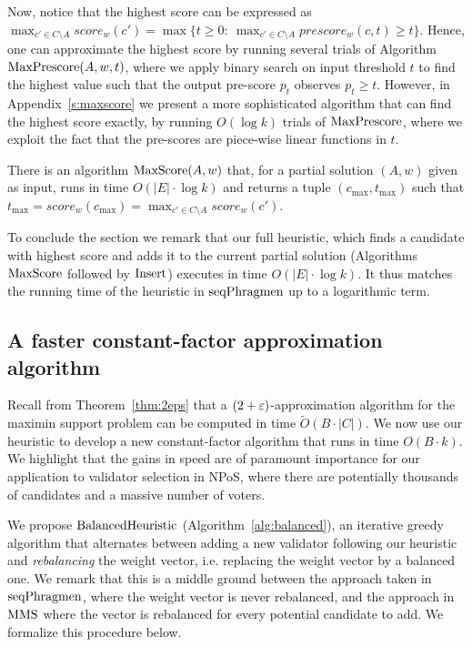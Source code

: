 Now, notice that the highest score can be expressed as $\max_{c'\in C\setminus A} score_w(c')=\max\{t\geq 0: \ \max_{c'\in C\setminus A} prescore_w(c,t)\geq t\}$. 
Hence, one can approximate the highest score by running several trials of Algorithm $\operatorname{MaxPrescore}(A,w,t)$, where we apply binary search on input threshold $t$ to find the highest value such that the output pre-score $p_t$ observes $p_t\geq t$. 
However, in Appendix~\ref{s:maxscore} we present a more sophisticated algorithm that can find the highest score exactly, by running $O(\log k)$ trials of $\operatorname{MaxPrescore}$, where we exploit the fact that the pre-scores are piece-wise linear functions in $t$.  

\begin{lemma}\label{lem:maxscore2}
There is an algorithm $\operatorname{MaxScore}(A,w)$ that, for a partial solution $(A,w)$ given as input, runs in time $O(|E|\cdot \log k)$ and returns a tuple $(c_{\max}, t_{\max})$ such that $t_{\max}=score_w(c_{\max})=\max_{c'\in C\setminus A} score_w(c')$.
\end{lemma}

To conclude the section we remark that our full heuristic, which finds a candidate with highest score and adds it to the current partial solution (Algorithms $\operatorname{MaxScore}$ followed by $\operatorname{Insert}$) executes in time $O(|E|\cdot \log k)$. It thus matches the running time of the heuristic in $\operatorname{seqPhragmen}$ up to a logarithmic term.

\subsection{A faster constant-factor approximation algorithm}\label{s:315}

Recall from Theorem~\ref{thm:2eps} that a $(2+\varepsilon)$-approximation algorithm for the maximin support problem can be computed in time $\tilde{O}(B\cdot |C|)$. We now use our heuristic to develop a new constant-factor algorithm that runs in time $O(B\cdot k)$. We highlight that the gains in speed are of paramount importance for our application to validator selection in NPoS, where there are potentially thousands of candidates and a massive number of voters.

We propose $\operatorname{BalancedHeuristic}$ (Algorithm~\ref{alg:balanced}), an iterative greedy algorithm that alternates between adding a new validator following our heuristic and \emph{rebalancing} the weight vector, i.e. replacing the weight vector by a balanced one. We remark that this is a middle ground between the approach taken in $\operatorname{seqPhragmen}$, where the weight vector is never rebalanced, and the approach in $\operatorname{MMS}$ where the vector is rebalanced for every potential candidate to add. We formalize this procedure below.

